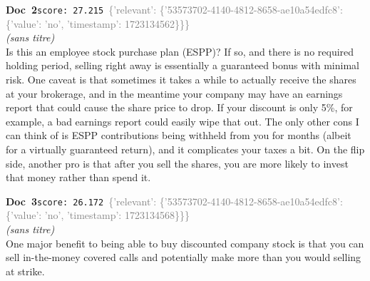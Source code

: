 \documentclass[a4paper,11pt]{article}
\begin{document}
\begin{docenv}
{\footnotesize\textcolor{doccolor}{\textbf{Doc~2}}}\hfill{\tiny\texttt{score:~27.215}}\ {\tiny\textcolor{gray}{\{'relevant': \{'53573702-4140-4812-8658-ae10a54edfc8': \{'value': 'no', 'timestamp': 1723134562\}\}\}}}\\[3pt]
{\small\textit{(sans titre)}}\\[2pt]
\vspace{2pt}
{\footnotesize 
Is this an employee stock purchase plan (ESPP)? If so, and there is no required holding period, selling right away is essentially a guaranteed bonus with minimal risk. One caveat is that sometimes it takes a while to actually receive the shares at your brokerage, and in the meantime your company may have an earnings report that could cause the share price to drop. If your discount is only 5\%, for example, a bad earnings report could easily wipe that out. The only other cons I can think of is ESPP contributions being withheld from you for months (albeit for a virtually guaranteed return), and it complicates your taxes a bit. On the flip side, another pro is that after you sell the shares, you are more likely to invest that money rather than spend it.}
\end{docenv}
\begin{docenv}
{\footnotesize\textcolor{doccolor}{\textbf{Doc~3}}}\hfill{\tiny\texttt{score:~26.172}}\ {\tiny\textcolor{gray}{\{'relevant': \{'53573702-4140-4812-8658-ae10a54edfc8': \{'value': 'no', 'timestamp': 1723134568\}\}\}}}\\[3pt]
{\small\textit{(sans titre)}}\\[2pt]
\vspace{2pt}
{\footnotesize 
One major benefit to being able to buy discounted company stock is that you can sell in-the-money covered calls and potentially make more than you would selling at strike.}
\end{docenv}
\end{document}

